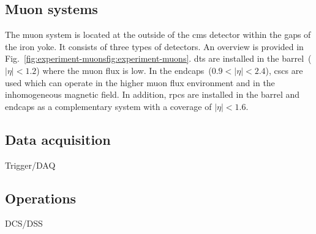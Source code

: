 \subsection{Muon systems}
\label{sec:experiment-muon-systems}

The muon system is located at the outside of the \gls{cms} detector within the gaps of the iron yoke. It consists of three types of detectors. An overview is provided in Fig.~\ref{fig:experiment-muonsfig:experiment-muons}. \glspl{dt} are installed in the barrel~($|\eta|<1.2$) where the muon flux is low. In the endcaps~($0.9<|\eta|<2.4$), \glspl{csc} are used which can operate in the higher muon flux environment and in the inhomogeneous magnetic field. In addition, \glspl{rpc} are installed in the barrel and endcaps as a complementary system with a coverage of $|\eta|<1.6$. 

\subsection{Data acquisition}
Trigger/DAQ

\subsection{Operations}
DCS/DSS
